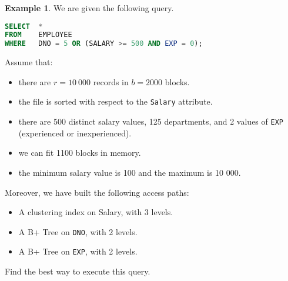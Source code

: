 \documentclass[a4paper, openany]{memoir}
\theoremstyle{definition}
\newtheorem{example}[subsection]{Example}
\begin{document}
\begin{example}
    We are given the following query.
\begin{lstlisting}[language=SQL]
SELECT  *
FROM    EMPLOYEE
WHERE   DNO = 5 OR (SALARY >= 500 AND EXP = 0);
\end{lstlisting}
    Assume that:
    \begin{itemize}
        \item there are $r = 10 \ 000$ records in $b = 2000$ blocks.
        \item the file is sorted with respect to the \texttt{Salary} attribute.
        \item there are 500 distinct salary values, 125 departments, and 2 values of \texttt{EXP} (experienced or inexperienced). 
        \item we can fit 1100 blocks in memory.
        \item the minimum salary value is 100 and the maximum is 10 000.
    \end{itemize}
    Moreover, we have built the following access paths:
    \begin{itemize}
        \item A clustering index on Salary, with 3 levels.
        \item A B+ Tree on \texttt{DNO}, with 2 levels.
        \item A B+ Tree on \texttt{EXP}, with 2 levels.
    \end{itemize}
    Find the best way to execute this query.
\end{example}
\end{document}
